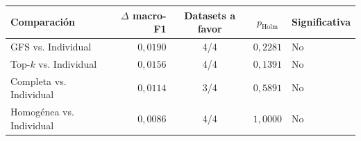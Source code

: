 \begin{resulttable}
\centering\fontsize{9}{11}\selectfont\setlength{\tabcolsep}{3.6pt}
\caption{Comparaciones de cada estrategia combinada frente a Individual con 21 descriptores. Diferencia media de macro-F1 entre datasets y valores $p$ de las comparaciones basadas en rangos de Friedman, ajustados con Holm.}
\label{tab:vs-individual}
\begin{tabular}{@{}lrccl@{}}
\toprule
Comparación & $\Delta$ macro-F1 & Datasets a favor & $p_{\mathrm{Holm}}$ & Significativa \\
\midrule
GFS vs. Individual & $0{,}0190$ & 4/4 & $0{,}2281$ & No \\
Top-$k$ vs. Individual & $0{,}0156$ & 4/4 & $0{,}1391$ & No \\
Completa vs. Individual & $0{,}0114$ & 3/4 & $0{,}5891$ & No \\
Homogénea vs. Individual & $0{,}0086$ & 4/4 & $1{,}0000$ & No \\
\bottomrule
\end{tabular}
\par{}
\end{resulttable}
\FloatBarrier
